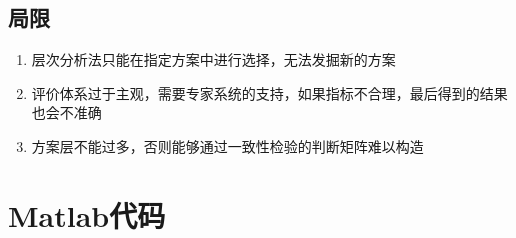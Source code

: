 \documentclass[withoutpreface]{cumcmthesis}
\begin{document}
    \subsection{局限}
    \begin{enumerate}
        \item 层次分析法只能在指定方案中进行选择，无法发掘新的方案
        \item 评价体系过于主观，需要专家系统的支持，如果指标不合理，最后得到的结果也会不准确
        \item 方案层不能过多，否则能够通过一致性检验的判断矩阵难以构造
    \end{enumerate}

    \appendix

    \section{Matlab代码}
\end{document}

